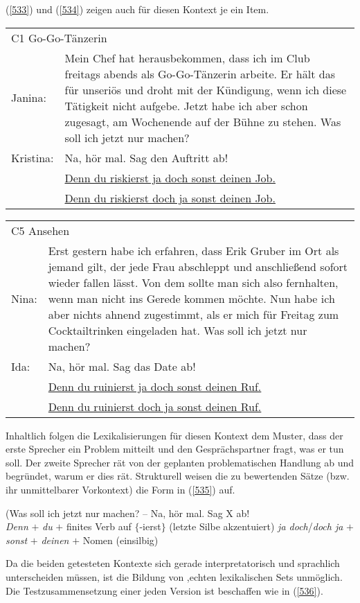 (\ref{533}) und (\ref{534}) zeigen auch für diesen Kontext je ein Item.

\begin{exe}
	\ex\label{533} 
	\begin{tabular}[t]{p{3em} p{22em}}
	\multicolumn{2}{l}{C1 Go-Go-Tänzerin}\\
    Janina:	& Mein Chef hat herausbekommen, dass ich im Club frei\-tags abends als Go-Go-Tänzerin arbeite. Er hält das für unseriös und droht mit der 			Kündigung, wenn ich diese Tätigkeit nicht aufgebe. Jetzt habe ich aber schon zugesagt, am Wochenende auf der Bühne zu stehen. Was soll ich jetzt nur 		machen?\\
	Kristina: & Na, hör mal. Sag den Auftritt ab!\\
	& \underline{Denn du riskierst ja doch sonst deinen Job.}\\
	& \underline{Denn du riskierst doch ja sonst deinen Job.}
    \end{tabular}
\end{exe}

\begin{exe}
	\ex\label{534} 
	\begin{tabular}[t]{p{2em} p{25em}}
	\multicolumn{2}{l}{C5 Ansehen}\\
    Nina: & Erst gestern habe ich erfahren, dass Erik Gruber im Ort als jemand gilt, der jede Frau abschleppt und anschließend 			sofort wieder fallen lässt. Von dem sollte man sich also fernhalten, wenn man nicht ins Gerede kommen möchte. Nun habe ich 			aber nichts ahnend zugestimmt, als er mich für Freitag zum Cocktailtrinken eingeladen hat. Was soll ich jetzt nur machen?\\
	Ida: & Na, hör mal. Sag das Date ab!\\
	& \underline{Denn du ruinierst ja doch sonst deinen Ruf.}\\
	& \underline{Denn du ruinierst doch ja sonst deinen Ruf.}
    \end{tabular}
\end{exe}
Inhaltlich folgen die Lexikalisierungen für diesen Kontext dem Muster, dass der erste Sprecher ein Problem mitteilt und den Gesprächspartner fragt, was er tun soll. Der zweite Sprecher rät von der geplanten problematischen Handlung ab und begründet, warum er dies rät. Strukturell weisen die zu bewertenden Sätze (bzw. ihr unmittelbarer Vorkontext) die Form in (\ref{535}) auf.

\begin{exe}
	\ex\label{535} 
	(Was soll ich jetzt nur machen? – Na, hör mal. Sag X ab!\\
	\textit{Denn} $\plus$ \textit{du} $\plus$ finites Verb auf $\lbrace$-ierst$\rbrace$ (letzte Silbe akzentuiert) \textit{ja doch}/\textit{doch ja} $\plus$ \textit{sonst} $\plus$ \textit{deinen} $\plus$ Nomen (einsilbig)
\end{exe}
Da die beiden getesteten Kontexte sich gerade interpretatorisch und sprachlich unterscheiden müssen, ist die Bildung von ,echten\grq {} lexikalischen Sets unmöglich. Die Testzusammensetzung einer jeden Version ist beschaffen wie in (\ref{536}).

